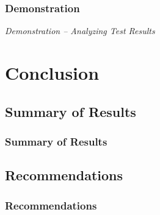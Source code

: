 \documentclass{beamer}
\begin{document}
\begin{frame}
\frametitle{Demonstration}
\begin{center}
\emph{Demonstration -- Analyzing Test Results}
\end{center}
\end{frame}

\section{Conclusion}
\subsection{Summary of Results}
\begin{frame}
\frametitle{Summary of Results}
\end{frame}

\subsection{Recommendations}
\begin{frame}
\frametitle{Recommendations}
\end{frame}
\end{document}
